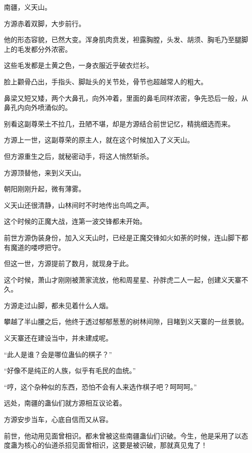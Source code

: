 
\begin{this_body}

南疆，义天山。

方源赤着双脚，大步前行。

他的形态容貌，已然大变。浑身肌肉贲发，袒露胸膛，头发、胡须、胸毛乃至腿脚上的毛发都分外浓密。

这些毛发都是土黄之色，一身衣服近乎破衣烂衫。

脸上颧骨凸出，手指头、脚趾头的关节处，骨节也超越常人的粗大。

鼻梁又短又矮，两个大鼻孔，向外冲着，里面的鼻毛同样浓密，争先恐后一般，从鼻孔内向外喷涌似的。

别看这副尊荣土不拉几，丑陋不堪，却是方源结合前世记忆，精挑细选而来。

方源上一世，这副尊荣的原主人，就在这个时候加入了义天山。

但方源重生之后，就秘密动手，将这人悄然斩杀。

方源顶替他，来到义天山。

朝阳刚刚升起，微有薄雾。

义天山还很清静，山林间时不时地传出鸟鸣之声。

这个时候的正魔大战，连第一波交锋都未开始。

前世方源伪装身份，加入义天山时，已经是正魔交锋如火如荼的时候，连山脚下都有魔道的喽啰把守。

但这一世，方源提前了数月，就现身于此。

这个时候，萧山才刚刚被萧家流放，他和周星星、孙胖虎二人一起，创建义天寨不久。

方源走过山脚，都未见着什么人烟。

攀越了半山腰之后，他终于透过郁郁葱葱的树林间隙，目睹到义天寨的一丝景貌。

义天寨还在建设当中，并未建成呢。

“此人是谁？会是哪位蛊仙的棋子？”

“好像不是纯正的人族，似乎有毛民的血统。”

“哼，这个杂种似的东西，恐怕不会有人来选作棋子吧？呵呵呵。”

远处，南疆的蛊仙们就方源相互议论着。

方源安步当车，心底自信而又从容。

前世，他动用见面曾相识。都未曾被这些南疆蛊仙们识破。今生，他是采用了以态度蛊为核心的仙道杀招见面曾相识，这要是被识破，那就真见鬼了！


\end{this_body}
